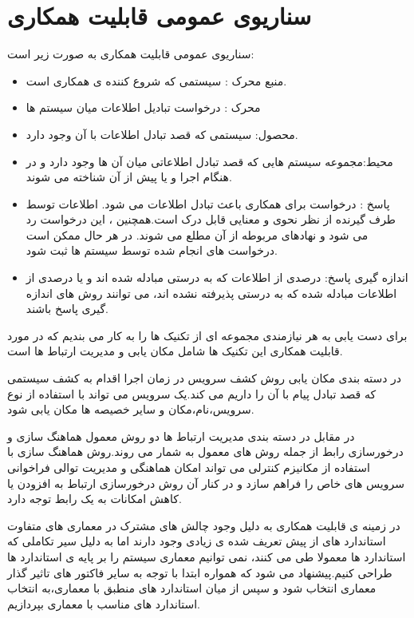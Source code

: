 \section{سناریوی عمومی قابلیت همکاری}
سناریو‌ی عمومی قابلیت همکاری به صورت زیر است:
\begin{itemize}
\item
منبع محرک : سیستمی که شروع کننده ی همکاری است.
\item
محرک : در‌خواست تبادیل اطلاعات میان سیستم ها
\item
محصول: سیستمی که قصد تبادل اطلاعات با آن وجود دارد.
\item
محیط:مجموعه سیستم هایی که قصد تبادل اطلاعاتی میان آن ها وجود دارد و در هنگام اجرا و یا پیش از آن شناخته می شوند.
\item
پاسخ : درخواست برای همکاری باعث تبادل اطلاعات می شود. اطلاعات توسط طرف گیرنده از نظر نحوی و معنایی قابل درک است.همچنین ، این درخواست رد می شود و نهادهای مربوطه از آن مطلع می شوند. در هر حال ممکن است درخواست های انجام شده توسط سیستم ها ثبت شود. 
\item
اندازه گیری پاسخ: درصدی از اطلاعات که به درستی مبادله شده اند و یا درصدی از اطلاعات مبادله شده که به درستی پذیرفته نشده اند، می توانند روش های اندازه گیری پاسخ باشند.
\end{itemize}

برای دست یابی به هر نیازمندی مجموعه ای از تکنیک ها را به کار می بندیم که در مورد قابلیت همکاری این تکنیک ها شامل مکان یابی  و مدیریت ارتباط ها  است.

در دسته بندی مکان یابی روش 	کشف سرویس  در زمان اجرا اقدام به کشف سیستمی که قصد تبادل پیام با آن را داریم می کند.یک سرویس می تواند با استفاده از نوع سرویس،‌نام،‌مکان و سایر خصیصه ها مکان یابی شود.

در مقابل در دسته بندی مدیریت ارتباط ها دو روش معمول هماهنگ سازی و درخور‌سازی رابط از جمله روش های معمول به شمار می روند.روش هماهنگ سازی  با استفاده از مکانیزم کنترلی می تواند امکان هماهنگی و مدیریت توالی فراخوانی سرویس های خاص را فراهم سازد و در کنار آن روش درخورسازی ارتباط به افزودن یا کاهش امکانات به یک رابط توجه دارد.

در زمینه ی قابلیت همکاری به دلیل وجود چالش های مشترک در معماری های متفاوت استاندارد های از پیش تعریف شده ی زیادی وجود دارند اما به دلیل سیر تکاملی که استاندارد ها معمولا طی می کنند، نمی توانیم معماری سیستم را بر پایه ی استاندارد ها طراحی کنیم.پیشنهاد می شود که همواره ابتدا با توجه به سایر فاکتور های تاثیر گذار معماری انتخاب شود و سپس از میان استاندارد های منطبق با معماری،‌به انتخاب استاندارد های مناسب با معماری بپردازیم.

